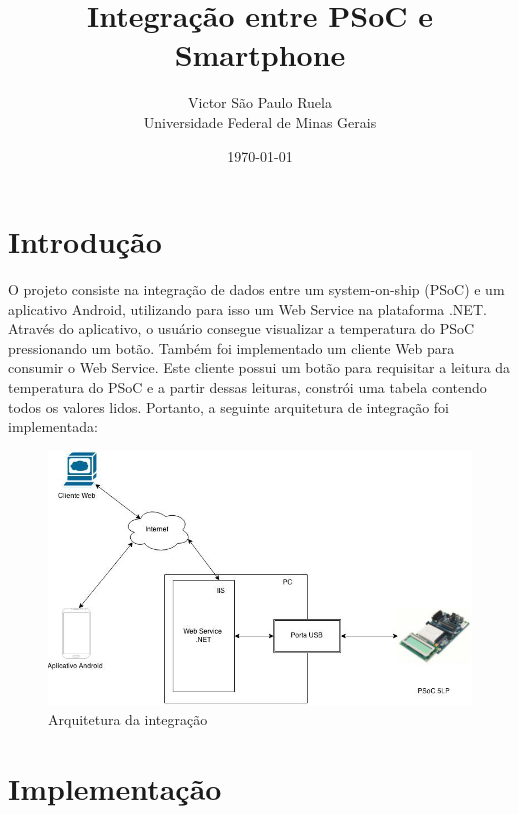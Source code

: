 \documentclass[a4paper,12pt,titlepage]{article}
\title{\textbf{ \Huge{Integração entre PSoC e Smartphone}}\\}
\author{Victor São Paulo Ruela\\
	Universidade Federal de Minas Gerais}
\date{\today}
\begin{document}
\maketitle

\tableofcontents
\newpage

\section{Introdução}
	O projeto consiste na integração de dados entre um system-on-ship (PSoC) e um aplicativo Android, utilizando para isso um Web Service na plataforma .NET.
	Através do aplicativo, o usuário consegue visualizar a temperatura do PSoC pressionando um botão. Também foi implementado um cliente Web para consumir o Web Service. Este cliente possui um botão para requisitar a leitura da temperatura do PSoC e a partir dessas leituras, constrói uma tabela contendo todos os valores lidos. Portanto, a seguinte arquitetura de integração foi implementada:
	
	\begin{figure}[h!]
		\centering
		\includegraphics[width=0.7\linewidth]{arquitetura}
		\caption{Arquitetura da integração}
		\label{fig:diagrama}
	\end{figure}
	  
\section{Implementação}
\end{document}
